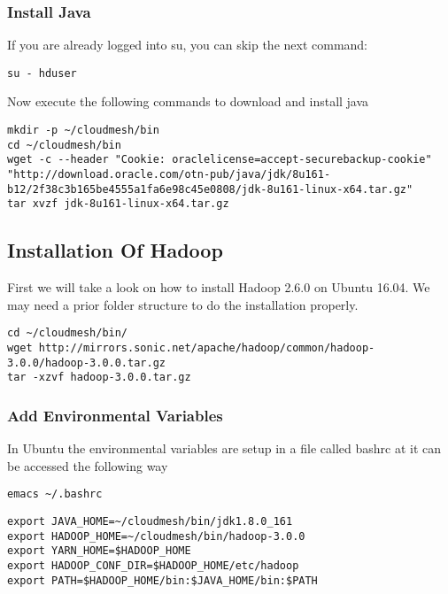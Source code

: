 \subsubsection{Install Java}

If you are already logged into su, you can skip the next command:

\begin{lstlisting}
su - hduser
\end{lstlisting}

Now execute the following commands to download and install java

\begin{lstlisting}
mkdir -p ~/cloudmesh/bin
cd ~/cloudmesh/bin
wget -c --header "Cookie: oraclelicense=accept-securebackup-cookie" "http://download.oracle.com/otn-pub/java/jdk/8u161-b12/2f38c3b165be4555a1fa6e98c45e0808/jdk-8u161-linux-x64.tar.gz"
tar xvzf jdk-8u161-linux-x64.tar.gz
\end{lstlisting}

\subsection{Installation Of Hadoop}

First we will take a look on how to install Hadoop 2.6.0 on Ubuntu
16.04. We may need a prior folder structure to do the installation
properly.

\begin{lstlisting}
cd ~/cloudmesh/bin/
wget http://mirrors.sonic.net/apache/hadoop/common/hadoop-3.0.0/hadoop-3.0.0.tar.gz
tar -xzvf hadoop-3.0.0.tar.gz
\end{lstlisting}

\subsubsection{Add Environmental Variables}

In Ubuntu the environmental variables are setup in a file called bashrc
at it can be accessed the following way

\begin{lstlisting}
emacs ~/.bashrc
\end{lstlisting}

\begin{lstlisting}
export JAVA_HOME=~/cloudmesh/bin/jdk1.8.0_161
export HADOOP_HOME=~/cloudmesh/bin/hadoop-3.0.0
export YARN_HOME=$HADOOP_HOME
export HADOOP_CONF_DIR=$HADOOP_HOME/etc/hadoop
export PATH=$HADOOP_HOME/bin:$JAVA_HOME/bin:$PATH
\end{lstlisting}


